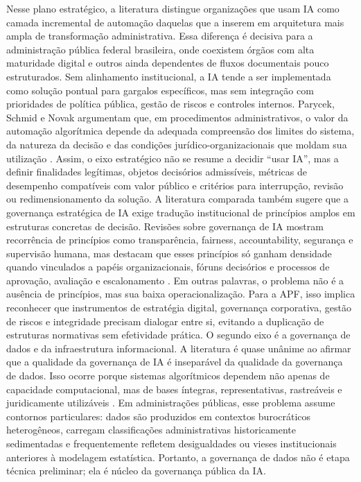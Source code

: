 \documentclass[12pt,a4paper]{article}
\begin{document}
Nesse plano estratégico, a literatura distingue organizações que usam IA como camada incremental de automação daquelas que a inserem em arquitetura mais ampla de transformação administrativa. Essa diferença é decisiva para a administração pública federal brasileira, onde coexistem órgãos com alta maturidade digital e outros ainda dependentes de fluxos documentais pouco estruturados. Sem alinhamento institucional, a IA tende a ser implementada como solução pontual para gargalos específicos, mas sem integração com prioridades de política pública, gestão de riscos e controles internos. Parycek, Schmid e Novak argumentam que, em procedimentos administrativos, o valor da automação algorítmica depende da adequada compreensão dos limites do sistema, da natureza da decisão e das condições jurídico-organizacionais que moldam sua utilização \autocite{parycek2023artificial}. Assim, o eixo estratégico não se resume a decidir “usar IA”, mas a definir finalidades legítimas, objetos decisórios admissíveis, métricas de desempenho compatíveis com valor público e critérios para interrupção, revisão ou redimensionamento da solução.
A literatura comparada também sugere que a governança estratégica de IA exige tradução institucional de princípios amplos em estruturas concretas de decisão. Revisões sobre governança de IA mostram recorrência de princípios como transparência, fairness, accountability, segurança e supervisão humana, mas destacam que esses princípios só ganham densidade quando vinculados a papéis organizacionais, fóruns decisórios e processos de aprovação, avaliação e escalonamento \autocite{batool2025ai} \autocite{sigfrids2022how}. Em outras palavras, o problema não é a ausência de princípios, mas sua baixa operacionalização. Para a APF, isso implica reconhecer que instrumentos de estratégia digital, governança corporativa, gestão de riscos e integridade precisam dialogar entre si, evitando a duplicação de estruturas normativas sem efetividade prática.
O segundo eixo é a governança de dados e da infraestrutura informacional. A literatura é quase unânime ao afirmar que a qualidade da governança de IA é inseparável da qualidade da governança de dados. Isso ocorre porque sistemas algorítmicos dependem não apenas de capacidade computacional, mas de bases íntegras, representativas, rastreáveis e juridicamente utilizáveis \autocite{parycek2023artificial} \autocite{pi2021machine}. Em administrações públicas, esse problema assume contornos particulares: dados são produzidos em contextos burocráticos heterogêneos, carregam classificações administrativas historicamente sedimentadas e frequentemente refletem desigualdades ou vieses institucionais anteriores à modelagem estatística. Portanto, a governança de dados não é etapa técnica preliminar; ela é núcleo da governança pública da IA.
\end{document}
